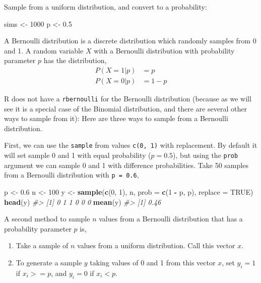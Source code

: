\documentclass[]{book}
\newenvironment{Shaded}{\begin{snugshade}}{\end{snugshade}}
\newcommand{\CommentTok}[1]{\textcolor[rgb]{0.56,0.35,0.01}{\textit{#1}}}
\newcommand{\DataTypeTok}[1]{\textcolor[rgb]{0.13,0.29,0.53}{#1}}
\newcommand{\DecValTok}[1]{\textcolor[rgb]{0.00,0.00,0.81}{#1}}
\newcommand{\FloatTok}[1]{\textcolor[rgb]{0.00,0.00,0.81}{#1}}
\newcommand{\KeywordTok}[1]{\textcolor[rgb]{0.13,0.29,0.53}{\textbf{#1}}}
\newcommand{\NormalTok}[1]{#1}
\newcommand{\OperatorTok}[1]{\textcolor[rgb]{0.81,0.36,0.00}{\textbf{#1}}}
\newcommand{\OtherTok}[1]{\textcolor[rgb]{0.56,0.35,0.01}{#1}}
\newcommand{\StringTok}[1]{\textcolor[rgb]{0.31,0.60,0.02}{#1}}
\providecommand{\tightlist}{%
  \setlength{\itemsep}{0pt}\setlength{\parskip}{0pt}}
\theoremstyle{definition}
\theoremstyle{definition}
\theoremstyle{definition}
\theoremstyle{remark}
\begin{document}
Sample from a uniform distribution, and convert to a probability:

\begin{Shaded}
\begin{Highlighting}[]
\NormalTok{sims <-}\StringTok{ }\DecValTok{1000}
\NormalTok{p <-}\StringTok{ }\FloatTok{0.5}
\end{Highlighting}
\end{Shaded}

A Bernoulli distribution is a discrete distribution which randomly
samples from 0 and 1. A random variable \(X\) with a Bernoulli
distribution with probability parameter \(p\) has the distribution, \[
\begin{aligned}
P(X = 1 | p) &= p \\
P(X = 0 | p) &= 1 - p
\end{aligned}
\]

R does not have a \texttt{rbernoulli} for the Bernoulli distribution
(because as we will see it is a special case of the Binomial
distribution, and there are several other ways to sample from it): Here
are three ways to sample from a Bernoulli distribution.

First, we can use the \texttt{sample} from values \texttt{c(0,\ 1)} with
replacement. By default it will set sample 0 and 1 with equal
probability (\(p = 0.5\)), but using the \texttt{prob} argument we can
sample 0 and 1 with difference probabilities. Take 50 samples from a
Bernoulli distribution with \texttt{p\ =\ 0.6},

\begin{Shaded}
\begin{Highlighting}[]
\NormalTok{p <-}\StringTok{ }\FloatTok{0.6}
\NormalTok{n <-}\StringTok{ }\DecValTok{100}
\NormalTok{y <-}\StringTok{ }\KeywordTok{sample}\NormalTok{(}\KeywordTok{c}\NormalTok{(}\DecValTok{0}\NormalTok{, }\DecValTok{1}\NormalTok{), n, }\DataTypeTok{prob =} \KeywordTok{c}\NormalTok{(}\DecValTok{1} \OperatorTok{-}\StringTok{ }\NormalTok{p, p), }\DataTypeTok{replace =} \OtherTok{TRUE}\NormalTok{)}
\KeywordTok{head}\NormalTok{(y)}
\CommentTok{#> [1] 0 1 1 0 0 0}
\KeywordTok{mean}\NormalTok{(y)}
\CommentTok{#> [1] 0.46}
\end{Highlighting}
\end{Shaded}

A second method to sample \(n\) values from a Bernoulli distribution
that has a probability parameter \(p\) is,

\begin{enumerate}
\def\labelenumi{\arabic{enumi}.}
\tightlist
\item
  Take a sample of \(n\) values from a uniform distribution. Call this
  vector \(x\).
\item
  To generate a sample \(y\) taking values of 0 and 1 from this vector
  \(x\), set \(y_i = 1\) if \(x_i >= p\), and \(y_i = 0\) if
  \(x_i < p\).
\end{enumerate}
\end{document}

